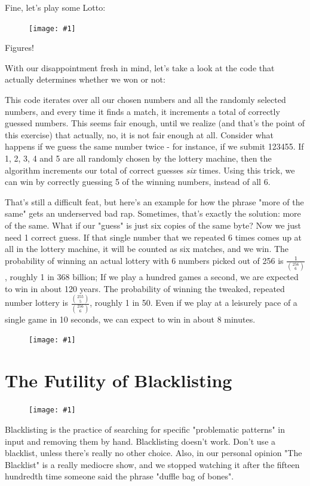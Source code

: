 \documentclass{article}
\newcommand{\displayimage}[1] {
\begin{figure}[H]
    \centering
    \texttt{[image: \#1]} 
\end{figure}
}
\newcommand{\wrapimageright}[1] {
    \begin{figure}
        \begin{center}
            \texttt{[image: \#1]} 
        \end{center}
    \end{figure}
}
\begin{document}
Fine, let's play some Lotto:

\displayimage{../12_lotto/normal_game.png}

Figures!

With our disappointment fresh in mind, let's take a look at the code that actually determines whether we won or not:



This code iterates over all our chosen numbers and all the randomly selected numbers, and every time it finds a match, it increments a total of correctly guessed numbers. This seems fair enough, until we realize (and that's the point of this exercise) that actually, no, it is not fair enough at all. Consider what happens if we guess the same number twice - for instance, if we submit 123455. If 1, 2, 3, 4 and 5 are all randomly chosen by the lottery machine, then the algorithm increments our total of correct guesses \textit{six} times. Using this trick, we can win by correctly guessing 5 of the winning numbers, instead of all 6.

That's still a difficult feat, but here's an example for how the phrase "more of the same" gets an underserved bad rap. Sometimes, that's exactly the solution: more of the same. What if our "guess" is just six copies of the same byte? Now we just need 1 correct guess. If that single number that we repeated 6 times comes up at all in the lottery machine, it will be counted as six matches, and we win. The probability of winning an actual lottery with 6 numbers picked out of 256 is $\frac{1}{{256 \choose 6}}$, roughly 1 in 368 billion; If we play a hundred games a second, we are expected to win in about 120 years. The probability of winning the tweaked, repeated number lottery is $\frac{{255 \choose 5}}{{256 \choose 6}}$, roughly 1 in 50. Even if we play at a leisurely pace of a single game in 10 seconds, we can expect to win in about 8 minutes.

\displayimage{../12_lotto/flag.png}

\section{The Futility of Blacklisting}

\wrapimageright{./images/aint_no_rule.jpg}
Blacklisting is the practice of searching for specific "problematic patterns" in input and removing them by hand. Blacklisting doesn't work. Don't use a blacklist, unless there's really no other choice. Also, in our personal opinion "The Blacklist" is a really mediocre show, and we stopped watching it after the fifteen hundredth time someone said the phrase "duffle bag of bones".
\end{document}
